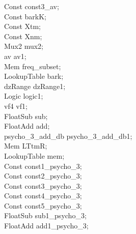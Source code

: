 \hspace*{2em}Const const3\_av; \\
\hspace*{2em}Const barkK; \\
\hspace*{2em}Const Xtm; \\
\hspace*{2em}Const Xnm; \\
\hspace*{2em}Mux2 mux2; \\
\hspace*{2em}av av1; \\
\hspace*{2em}Mem freq\_subset; \\
\hspace*{2em}LookupTable bark; \\
\hspace*{2em}dzRange dzRange1; \\
\hspace*{2em}Logic logic1; \\
\hspace*{2em}vf4 vf1; \\
\hspace*{2em}FloatSub sub; \\
\hspace*{2em}FloatAdd add; \\
\hspace*{2em}psycho\_3\_add\_db psycho\_3\_add\_db1; \\
\hspace*{2em}Mem LTtmR; \\
\hspace*{2em}LookupTable mem; \\
\hspace*{2em}Const const1\_psycho\_3;  \\
\hspace*{2em}Const const2\_psycho\_3;  \\
\hspace*{2em}Const const3\_psycho\_3;  \\
\hspace*{2em}Const const4\_psycho\_3; \\
\hspace*{2em}Const const5\_psycho\_3; \\
\hspace*{2em}FloatSub sub1\_psycho\_3; \\
\hspace*{2em}FloatAdd add1\_psycho\_3; \\
